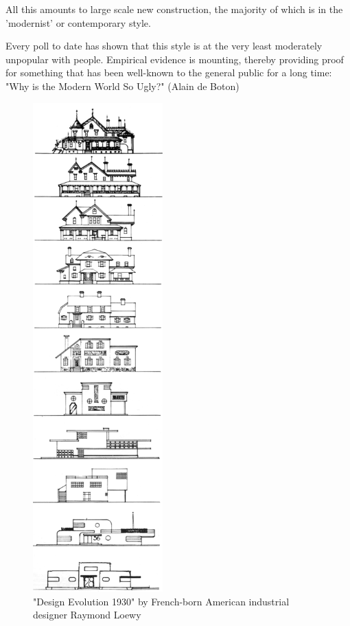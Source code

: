\documentclass{article}
\begin{document}
\begin{minipage}{0.55\textwidth}
    All this amounts to large scale new construction, the majority of which is in the 'modernist' or contemporary style.
    
    Every poll to date has shown that this style is at the very least moderately unpopular with people. Empirical evidence is mounting, thereby providing proof for something that has been well-known to the general public for a long time: "Why is the Modern World So Ugly?" (Alain de Boton)

\end{minipage}\hspace{15mm}
\begin{minipage}{0.35\textwidth}
    \begin{figure}[H]
    \includegraphics[width=50mm]{./figures/loewy_architecture.png}
    \caption{
        "Design Evolution 1930" by French-born American industrial designer Raymond Loewy \cite{loewy_industrial_1979}
    }
    \label{fig:loewy}
    \end{figure}
\end{minipage}
\end{document}

